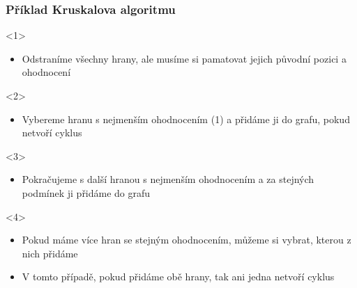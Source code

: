 \documentclass[hidelinks, 10pt, pdf, hyperref={unicode}]{beamer}
\begin{document}
    \begin{frame}[t]
        \frametitle{Příklad Kruskalova algoritmu}
        \begin{onlyenv}<1>
            \begin{center}
            \end{center}
                \begin{itemize}
                    \item{Odstraníme všechny hrany, ale musíme si pamatovat jejich původní pozici a ohodnocení}
                \end{itemize}
        \end{onlyenv}

        \begin{onlyenv}<2>
            \begin{center}
            \end{center}
                \begin{itemize}
                    \item{Vybereme hranu s nejmenším ohodnocením (1) a přidáme ji do grafu, pokud netvoří cyklus}
                \end{itemize} 
        \end{onlyenv}

        \begin{onlyenv}<3>
            \begin{center}
            \end{center}
                \begin{itemize}
                    \item{Pokračujeme s další hranou s nejmenším ohodnocením a za stejných podmínek ji přidáme do grafu}
                \end{itemize}
        \end{onlyenv}

        \begin{onlyenv}<4>
            \begin{center}
            \end{center}
                \begin{itemize}
                    \item{Pokud máme více hran se stejným ohodnocením, můžeme si vybrat, kterou z nich přidáme}
                    \item{V tomto případě, pokud přidáme obě hrany, tak ani jedna netvoří cyklus}     
                \end{itemize} 
        \end{onlyenv}


\end{frame}
\end{document}
